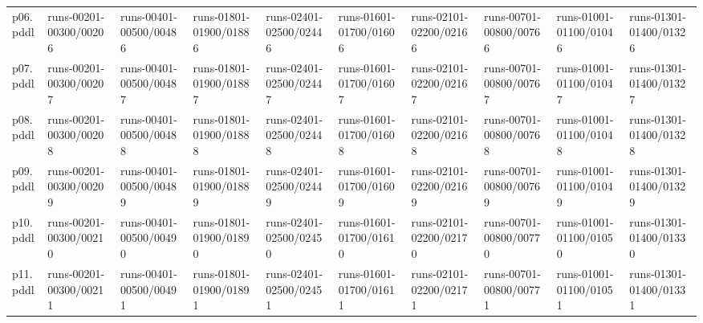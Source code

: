 \documentclass{article}
\begin{document}
\begin{tabular}{@{}lrrrrrrrrr@{}}
p06.pddl & \multicolumn{1}{|l|}{runs-00201-00300/00206} & \multicolumn{1}{|l|}{runs-00401-00500/00486} & \multicolumn{1}{|l|}{runs-01801-01900/01886} & \multicolumn{1}{|l|}{runs-02401-02500/02446} & \multicolumn{1}{|l|}{runs-01601-01700/01606} & \multicolumn{1}{|l|}{runs-02101-02200/02166} & \multicolumn{1}{|l|}{runs-00701-00800/00766} & \multicolumn{1}{|l|}{runs-01001-01100/01046} & \multicolumn{1}{|l|}{runs-01301-01400/01326} \\
p07.pddl & \multicolumn{1}{|l|}{runs-00201-00300/00207} & \multicolumn{1}{|l|}{runs-00401-00500/00487} & \multicolumn{1}{|l|}{runs-01801-01900/01887} & \multicolumn{1}{|l|}{runs-02401-02500/02447} & \multicolumn{1}{|l|}{runs-01601-01700/01607} & \multicolumn{1}{|l|}{runs-02101-02200/02167} & \multicolumn{1}{|l|}{runs-00701-00800/00767} & \multicolumn{1}{|l|}{runs-01001-01100/01047} & \multicolumn{1}{|l|}{runs-01301-01400/01327} \\
p08.pddl & \multicolumn{1}{|l|}{runs-00201-00300/00208} & \multicolumn{1}{|l|}{runs-00401-00500/00488} & \multicolumn{1}{|l|}{runs-01801-01900/01888} & \multicolumn{1}{|l|}{runs-02401-02500/02448} & \multicolumn{1}{|l|}{runs-01601-01700/01608} & \multicolumn{1}{|l|}{runs-02101-02200/02168} & \multicolumn{1}{|l|}{runs-00701-00800/00768} & \multicolumn{1}{|l|}{runs-01001-01100/01048} & \multicolumn{1}{|l|}{runs-01301-01400/01328} \\
p09.pddl & \multicolumn{1}{|l|}{runs-00201-00300/00209} & \multicolumn{1}{|l|}{runs-00401-00500/00489} & \multicolumn{1}{|l|}{runs-01801-01900/01889} & \multicolumn{1}{|l|}{runs-02401-02500/02449} & \multicolumn{1}{|l|}{runs-01601-01700/01609} & \multicolumn{1}{|l|}{runs-02101-02200/02169} & \multicolumn{1}{|l|}{runs-00701-00800/00769} & \multicolumn{1}{|l|}{runs-01001-01100/01049} & \multicolumn{1}{|l|}{runs-01301-01400/01329} \\
p10.pddl & \multicolumn{1}{|l|}{runs-00201-00300/00210} & \multicolumn{1}{|l|}{runs-00401-00500/00490} & \multicolumn{1}{|l|}{runs-01801-01900/01890} & \multicolumn{1}{|l|}{runs-02401-02500/02450} & \multicolumn{1}{|l|}{runs-01601-01700/01610} & \multicolumn{1}{|l|}{runs-02101-02200/02170} & \multicolumn{1}{|l|}{runs-00701-00800/00770} & \multicolumn{1}{|l|}{runs-01001-01100/01050} & \multicolumn{1}{|l|}{runs-01301-01400/01330} \\
p11.pddl & \multicolumn{1}{|l|}{runs-00201-00300/00211} & \multicolumn{1}{|l|}{runs-00401-00500/00491} & \multicolumn{1}{|l|}{runs-01801-01900/01891} & \multicolumn{1}{|l|}{runs-02401-02500/02451} & \multicolumn{1}{|l|}{runs-01601-01700/01611} & \multicolumn{1}{|l|}{runs-02101-02200/02171} & \multicolumn{1}{|l|}{runs-00701-00800/00771} & \multicolumn{1}{|l|}{runs-01001-01100/01051} & \multicolumn{1}{|l|}{runs-01301-01400/01331} \\

\end{tabular}
\end{document}
